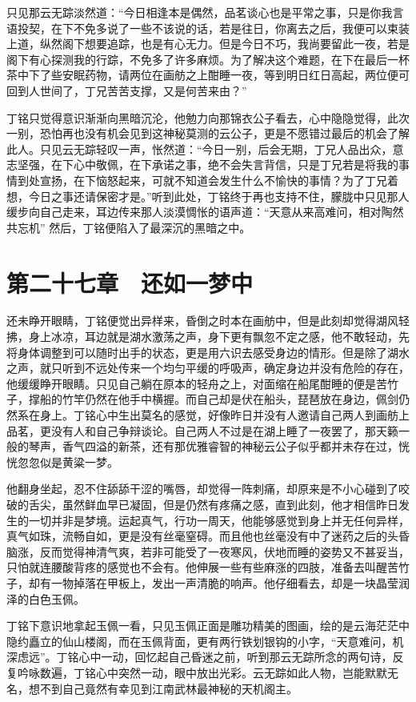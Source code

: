 只见那云无踪淡然道：“今日相逢本是偶然，品茗谈心也是平常之事，只是你我言语投契，在下不免多说了一些不该说的话，若是往日，你离去之后，我便可以束装上道，纵然阁下想要追踪，也是有心无力。但是今日不巧，我尚要留此一夜，若是阁下有心探测我的行踪，不免多了许多麻烦。为了解决这个难题，在下在最后一杯茶中下了些安眠药物，请两位在画舫之上酣睡一夜，等到明日红日高起，两位便可回到人世间了，丁兄苦苦支撑，又是何苦来由？”

丁铭只觉得意识渐渐向黑暗沉沦，他勉力向那锦衣公子看去，心中隐隐觉得，此次一别，恐怕再也没有机会见到这神秘莫测的云公子，更是不愿错过最后的机会了解此人。只见云无踪轻叹一声，怅然道：“今日一别，后会无期，丁兄人品出众，意志坚强，在下心中敬佩，在下承诺之事，绝不会失言背信，只是丁兄若是将我的事情到处宣扬，在下恼怒起来，可就不知道会发生什么不愉快的事情？为了丁兄着想，今日之事还请保密才是。”听到此处，丁铭终于再也支持不住，朦胧中只见那人缓步向自己走来，耳边传来那人淡漠惆怅的语声道：“天意从来高难问，相对陶然共忘机” 然后，丁铭便陷入了最深沉的黑暗之中。

\chapter{第二十七章　还如一梦中}

还未睁开眼睛，丁铭便觉出异样来，昏倒之时本在画舫中，但是此刻却觉得湖风轻拂，身上冰凉，耳边就是湖水激荡之声，身下更有飘忽不定之感，他不敢轻动，先将身体调整到可以随时出手的状态，更是用六识去感受身边的情形。但是除了湖水之声，就只听到不远处传来一个均匀平缓的呼吸声，确定身边并没有危险的存在，他缓缓睁开眼睛。只见自己躺在原本的轻舟之上，对面缩在船尾酣睡的便是苦竹子，撑船的竹竿仍然在他手中横握。而自己却是伏在船头，琵琶放在身边，佩剑仍然系在身上。丁铭心中生出莫名的感觉，好像昨日并没有人邀请自己两人到画舫上品茗，更没有人和自己争辩谈论。自己两人不过是在湖上睡了一夜罢了，那天籁一般的琴声，香气四溢的新茶，还有那优雅睿智的神秘云公子似乎都并未存在过，恍恍忽忽似是黄粱一梦。

他翻身坐起，忍不住舔舔干涩的嘴唇，却觉得一阵刺痛，却原来是不小心碰到了咬破的舌尖，虽然鲜血早已凝固，但是仍然有疼痛之感，直到此刻，他才相信昨日发生的一切并非是梦境。运起真气，行功一周天，他能够感觉到身上并无任何异样，真气如珠，流畅自如，更是没有丝毫窒碍。而且他也丝毫没有中了迷药之后的头昏脑涨，反而觉得神清气爽，若非可能受了一夜寒风，伏地而睡的姿势又不甚妥当，只怕就连腰酸背疼的感觉也不会有。他伸展一些有些麻涨的四肢，准备去叫醒苦竹子，却有一物掉落在甲板上，发出一声清脆的响声。他仔细看去，却是一块晶莹润泽的白色玉佩。

丁铭下意识地拿起玉佩一看，只见玉佩正面是雕功精美的图画，绘的是云海茫茫中隐约矗立的仙山楼阁，而在玉佩背面，更有两行铁划银钩的小字，“天意难问，机深虑远”。丁铭心中一动，回忆起自己昏迷之前，听到那云无踪所念的两句诗，反复吟咏数遍，丁铭心中突然一动，眼中放出光彩。云无踪如此人物，岂能默默无名，想不到自己竟然有幸见到江南武林最神秘的天机阁主。


